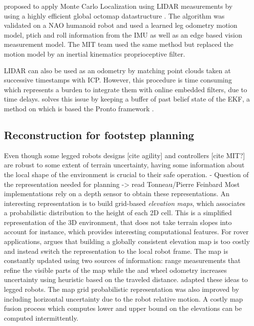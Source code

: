  
\cite{hornung2014monte} proposed to apply Monte Carlo Localization using LIDAR measurements by using a highly efficient global octomap datastructure \cite{hornung2013octomap}.
The algorithm was validated on a NAO humanoid robot and used a learned leg odometry motion model, ptich and roll information from the IMU as well as an edge based vision measurement model.
The MIT team \cite{fallon2014drift} used the same method but replaced the motion model by an inertial kinematics proprioceptive filter. 

LIDAR can also be used as an odometry by matching point clouds taken at successive timestamps with ICP. However, this procedure is time consuming 
which represents a burden to integrate them with online embedded filters, due to time delays. \cite{nobili2017heterogeneous} solves this issue by keeping a
buffer of past belief state of the EKF, a method on which is based the Pronto framework \cite{camurri2020pronto}.



\subsection{Reconstruction for footstep planning}
Even though some legged robots designs [cite agility] and controllers [cite MIT?] are robust to some extent of terrain uncertainty, having some information about the local
shape of the environment is crucial to their safe operation. 
- Question of the representation needed for planning -> read Tonneau/Pierre Feinbard
Most implementations rely on a depth sensor to obtain these representations. 
An interesting representation is to build grid-based \textit{elevation maps}, which associates a probabilistic distribution to the height of each 2D cell. 
This is a simplified representation of the 3D environment, that does not take terrain slopes into account for instance, which provides interesting computational features. 
For rover applications, \cite{kleiner2007real} argues that building a globally consistent elevation map is too costly and instead switch the representation to the local robot frame. 
The map is constantly updated using two sources of information: range measurements that refine the visible parts of the map while the and wheel odometry increases uncertainty using heuristic
based on the traveled distance. \cite{fankhauser2014robot, fankhauser2018probabilistic} adapted these ideas to legged robots. The map grid probabilistic representation
was also improved by including horizontal uncertainty due to the robot relative motion. A costly map fusion process which computes lower and upper bound on the elevations
can be computed intermittently. 

